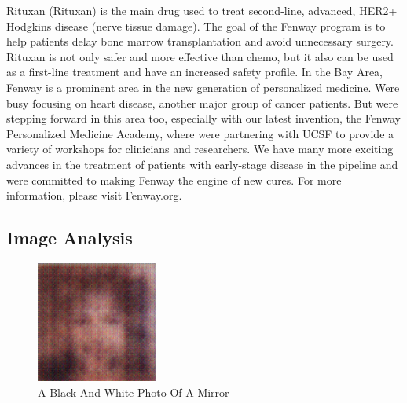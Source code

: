 \documentclass{article}%
\begin{document}
Rituxan (Rituxan) is the main drug used to treat second{-}line, advanced, HER2+ Hodgkins disease (nerve tissue damage). The goal of the Fenway program is to help patients delay bone marrow transplantation and avoid unnecessary surgery. Rituxan is not only safer and more effective than chemo, but it also can be used as a first{-}line treatment and have an increased safety profile.\newline%
In the Bay Area, Fenway is a prominent area in the new generation of personalized medicine. Were busy focusing on heart disease, another major group of cancer patients. But were stepping forward in this area too, especially with our latest invention, the Fenway Personalized Medicine Academy, where were partnering with UCSF to provide a variety of workshops for clinicians and researchers.\newline%
We have many more exciting advances in the treatment of patients with early{-}stage disease in the pipeline and were committed to making Fenway the engine of new cures.\newline%
For more information, please visit Fenway.org.

%
\subsection{Image Analysis}%
\label{subsec:ImageAnalysis}%


\begin{figure}[h!]%
\centering%
\includegraphics[width=150px]{500_fake_images/samples_5_270.png}%
\caption{A Black And White Photo Of A Mirror}%
\end{figure}

%
\end{document}
